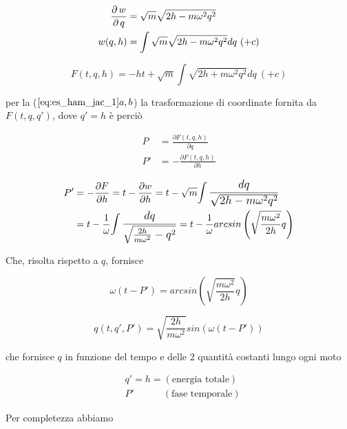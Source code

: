 \begin{align*}
\frac{\operatorname{\partial} w}{\operatorname{\partial} q} &= \sqrt{m} \sqrt{2h - m \omega^2q^2}\\
w (q, h) &= \int \sqrt{m} \sqrt{2h - m \omega^2q^2} dq~(+ c)
\end{align*}

\begin{equation}
F (t, q, h) = - h t + \sqrt{m} \int \sqrt{2h + m \omega^2 q^2} dq ~ (+ c)
\end{equation}

per la ($ \ref{eq:es_ham_jac_1} a, b $) la trasformazione di coordinate fornita da $ F (t, q, q') $, dove $ q' = h $ è perciò

\begin{align*}
P &= \frac{\partial F (t, q, h)}{\partial q} \\
P' &= -\frac{\partial F (t, q, h)}{\partial h}
\end{align*}

\begin{equation*}
\begin{split}
P' &= - \frac{\partial F}{\partial h} = t - \frac{\partial w}{\partial h} = t - \sqrt{m} \mathlarger{\int{\frac{dq}{\sqrt{2h - m \omega^2 q^2}}}} \\
&= t - \frac{1}{\omega} \mathlarger{\int{\frac{dq}{\sqrt{\frac{2h}{m\omega^2} - q^2}}}} = t - \frac{1}{\omega} arcsin \left( \sqrt{\frac{m \omega^2}{2h}} q \right)
\end{split}
\end{equation*}

Che, risolta rispetto a $ q $, fornisce

\begin{equation*}
\omega (t - P') = arcsin \left( \sqrt{\frac{m\omega^2}{2h}} q \right)
\end{equation*}

\begin{equation} \label{eq:es_ham_jac_7}
q (t, q', P') = \sqrt{\frac{2h}{m \omega^2}} sin(\omega(t - P'))
\end{equation}

che fornisce $ q $ in funzione del tempo e delle $ 2 $ quantità costanti lungo ogni moto

\begin{align*}
&q' = h = (\text{energia totale}) \\
&P' \qquad \quad (\text{fase temporale})
\end{align*}

Per completezza abbiamo

